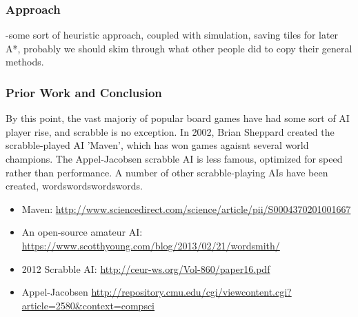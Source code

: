 \documentclass[12pt]{article}
\begin{document}

\subsubsection*{Approach}
-some sort of heuristic approach, coupled with simulation, saving tiles for later 
A*, probably we should skim through what other people did to copy their general methods.

\subsubsection*{Prior Work and Conclusion}
By this point, the vast majoriy of popular board games have had some
sort of AI player rise, and scrabble is no exception. In 2002, Brian
Sheppard created the scrabble-played AI 'Maven', which has won games
agaisnt several world champions.  The Appel-Jacobsen scrabble AI is
less famous, optimized for speed rather than performance.  A number of
other scrabble-playing AIs have been created, wordswordswordswords.

\begin{footnotesize}
\begin{itemize}
\item Maven: \url{http://www.sciencedirect.com/science/article/pii/S0004370201001667}
\item An open-source amateur AI: \url{https://www.scotthyoung.com/blog/2013/02/21/wordsmith/}
\item 2012 Scrabble AI: \url{http://ceur-ws.org/Vol-860/paper16.pdf}
\item Appel-Jacobsen \url{http://repository.cmu.edu/cgi/viewcontent.cgi?article=2580&context=compsci}
\end{itemize}
\end{footnotesize}
\end{document}
